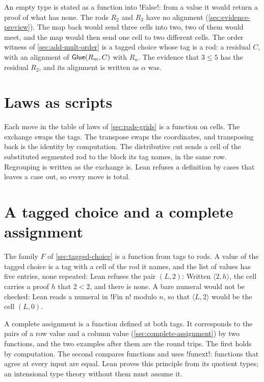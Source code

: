 An empty type is stated as a function into \li!False!: from a value it would
return a proof of what has none. The rods $R_2$ and $R_3$ have no alignment
(\cref{sec:evidence-preview}). The map back would send three cells into two,
two of them would meet, and the map would then send one cell to two
different cells. The order witness of \cref{sec:add-mult-order} is a tagged
choice whose tag is a rod: a residual $C$, with an alignment of
${\mathsf{Glue}}(R_m,C)$ with $R_n$. The evidence that $3\le5$ has the residual $R_2$,
and its alignment is written as $\alpha$ was.

\section*{Laws as scripts}
\label{sec:lean-scripts}

Each move in the table of laws of \cref{sec:rods-grids} is a function on
cells. The exchange swaps the tags. The transpose swaps the coordinates, and
transposing back is the identity by computation. The distributive cut sends
a cell of the substituted segmented rod to the block its tag names, in the
same row. Regrouping is written as the exchange is. Lean refuses a definition
by cases that leaves a case out, so every move is total.

\section*{A tagged choice and a complete assignment}
\label{sec:lean-sigma-pi}

The family $F$ of \cref{sec:tagged-choice} is a function from tags to rods.
A value of the tagged choice is a tag with a cell of the rod it names, and
the list of values has five entries, none repeated:
Lean refuses the pair $(L,2)$:
Written $\langle2,h\rangle$, the cell carries a proof $h$ that $2<2$, and
there is none. A bare numeral would not be checked: Lean reads a numeral in
\li!Fin n! modulo $n$, so that $\langle L,2\rangle$ would be the cell
$(L,0)$.

A complete assignment is a function defined at both tags. It corresponds to
the pairs of a row value and a column value (\cref{sec:complete-assignment})
by two functions, and the two examples after them are the round trips. The
first holds by computation. The second compares functions and uses
\li!funext!: functions that agree at every input are equal. Lean proves this
principle from its quotient types; an intensional type theory without them
must assume it.

